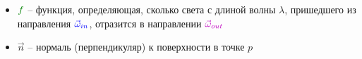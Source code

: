 \documentclass{beamer}
\begin{document}
\begin{frame}[fragile]
\begin{itemize}
\pause
\item \begin{math}{\color{green}f}\end{math} -- функция, определяющая, сколько света с длиной волны \begin{math}\lambda\end{math}, пришедшего из направления \begin{math}{\color{blue}\vec\omega_{in}}\end{math}, отразится в направлении \begin{math}{\color{magenta}\vec\omega_{out}}\end{math}
\pause
\item \begin{math}\vec n\end{math} -- нормаль (перпендикуляр) к поверхности в точке \begin{math}p\end{math}
\end{itemize}
\end{frame}
\end{document}
